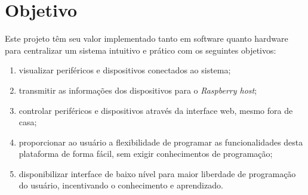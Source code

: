 \documentclass[../../layout.tex]{subfiles}
\begin{document}
\section{Objetivo}
Este projeto têm seu valor implementado tanto em software quanto hardware para centralizar um sistema intuitivo e prático com os seguintes objetivos:

\begin{enumerate}[label=\alph*)]
\itemsep0em
	\item visualizar periféricos e dispositivos conectados ao sistema;
	\item transmitir as informações dos dispositivos para o \emph{Raspberry host};
	\item controlar periféricos e dispositivos através da interface web, mesmo fora de casa;
	\item proporcionar ao usuário a flexibilidade de programar as funcionalidades desta plataforma de forma fácil, sem exigir conhecimentos de programação;
	\item disponibilizar interface de baixo nível para maior liberdade de programação do usuário, incentivando o conhecimento e aprendizado.
\end{enumerate}
\end{document}
